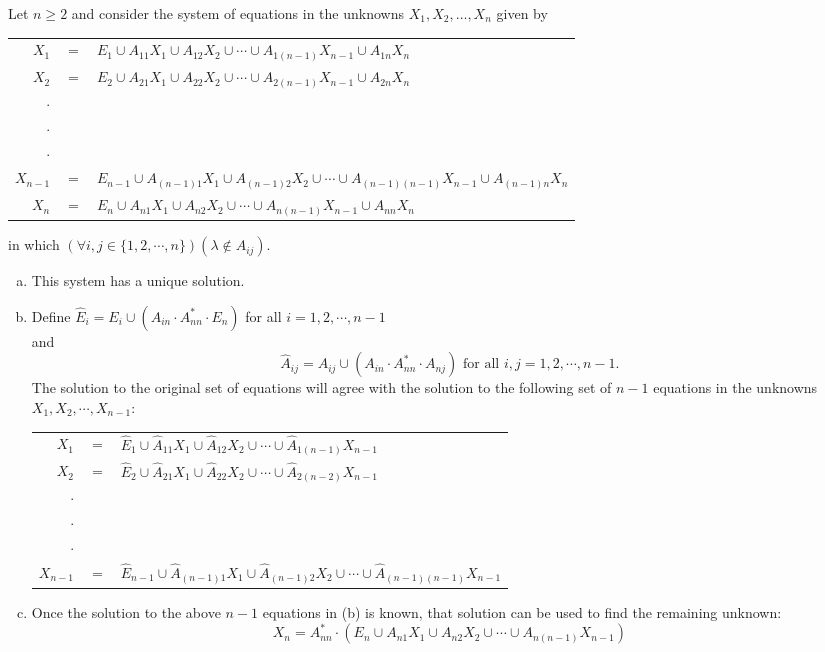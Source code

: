 \begin{thm}\label{thm-6.2}
Let $n \geq 2$ and consider the system of equations in the unknowns $X_1,X_2,
\ldots,X_n$ given by
\begin{center}\begin{tabular}{rcl}
$X_1$ & $=$ & $E_1 \cup A_{11}X_1 \cup A_{12}X_2 \cup \cdots \cup A_{1(n-1)}
	X_{n-1} \cup A_{1n}X_n$ \\
$X_2$ & $=$ & $E_2 \cup A_{21}X_1 \cup A_{22}X_2 \cup \cdots \cup A_{2(n-1)}
	X_{n-1} \cup A_{2n}X_n$ \\
$\cdot$ && \\
$\cdot$ && \\
$\cdot$ && \\
$X_{n-1}$ & $=$ & $E_{n-1} \cup A_{(n-1)1}X_1 \cup A_{(n-1)2}X_2 \cup \cdots
	\cup A_{(n-1)(n-1)}X_{n-1} \cup A_{(n-1)n}X_n$ \\
$X_n$ & $=$ & $E_n \cup A_{n1}X_1 \cup A_{n2}X_2 \cup \cdots \cup
	A_{n(n-1)}X_{n-1} \cup A_{nn}X_n$
\end{tabular}\end{center}
in which $(\forall i,j \in \{1,2, \cdots ,n\})(\lambda \not \in A_{ij})$.
\begin{enumerate}[a.]
\item This system has a unique solution.
\item Define $\hat{E}_i = E_i \cup (A_{in} \cdot A^*_{nn} \cdot E_n)$ for all
	$i=1,2, \cdots ,n - 1$ \\
and
\[ \hat{A}_{ij} = A_{ij} \cup (A_{in} \cdot A^*_{nn} \cdot A_{nj})\text{ for
	all }i,j = 1,2, \cdots ,n - 1. \]
The solution to the original set of equations will agree with the solution to
the following set of $n-1$ equations in the unknowns $X_1,X_2,\cdots,X_{n-1}$:
\begin{center}\begin{tabular}{rcl}
$X_1$ & $=$ & $\hat{E}_1 \cup \hat{A}_{11}X_1 \cup \hat{A}_{12}X_2 \cup \cdots
	\cup \hat{A}_{1(n-1)}X_{n-1}$ \\
$X_2$ & $=$ & $\hat{E}_2 \cup \hat{A}_{21}X_1 \cup \hat{A}_{22}X_2 \cup \cdots
	\cup \hat{A}_{2(n-2)}X_{n-1}$ \\
$\cdot$ && \\
$\cdot$ && \\
$\cdot$ && \\
$X_{n-1}$ & $=$ & $\hat{E}_{n-1} \cup \hat{A}_{(n-1)1}X_1 \cup \hat{A}_{(n-1)2}
	X_2 \cup \cdots \cup \hat{A}_{(n-1)(n-1)}X_{n-1}$
\end{tabular}\end{center}
\item Once the solution to the above $n - 1$ equations in (b) is known, that
solution can be used to find the remaining unknown:
\[ X_n = A^*_{nn} \cdot (E_n \cup A_{n1}X_1 \cup A_{n2}X_2 \cup \cdots \cup
	A_{n(n-1)}X_{n-1}) \]
\end{enumerate}


\end{thm}
